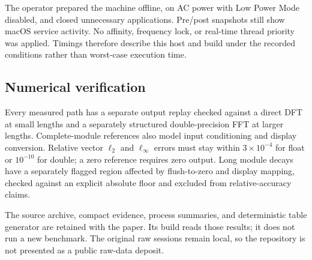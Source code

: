 The operator prepared the machine offline, on AC power with Low Power Mode
disabled, and closed unnecessary applications. Pre/post snapshots still show
macOS service activity. No affinity, frequency lock, or real-time thread
priority was applied. Timings therefore describe this host and build under
the recorded conditions rather than worst-case execution time.

\subsection{Numerical verification}
Every measured path has a separate output replay checked against a direct
DFT at small lengths and a separately structured double-precision FFT at
larger lengths. Complete-module references also model input conditioning and
display conversion. Relative vector $\ell_2$ and $\ell_\infty$ errors must
stay within $3\times10^{-4}$ for float or $10^{-10}$ for double; a zero
reference requires zero output. Long module decays have a separately flagged
region affected by flush-to-zero and display mapping, checked against an
explicit absolute floor and excluded from relative-accuracy claims.

The source archive, compact evidence, process summaries, and deterministic
table generator are retained with the paper. Its build reads those results;
it does not run a new benchmark. The original raw sessions remain local,
so the repository is not presented as a public raw-data deposit.
